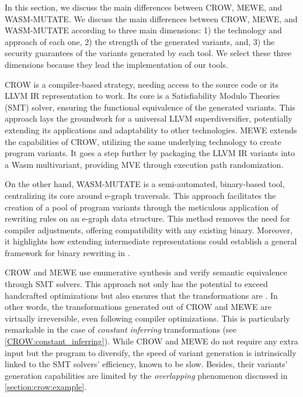 

In this section, we discuss the main differences between CROW, MEWE, and WASM-MUTATE.
We discuss the main differences between CROW, MEWE, and WASM-MUTATE according to three main dimensions: 1) the technology and approach of each one, 2) the strength of the generated variants, and, 3) the security guarantees of the variants generated by each tool.
We select these three dimensions because they lead the implementation of our tools.


CROW is a compiler-based strategy, needing access to the source code or its LLVM IR representation to work. 
Its core is a Satisfiability Modulo Theories (SMT) solver, ensuring the functional equivalence of the generated variants.
This approach lays the groundwork for a universal LLVM superdiversifier, potentially extending its applications and adaptability to other technologies.
MEWE extends the capabilities of CROW, utilizing the same underlying technology to create program variants. 
It goes a step further by packaging the LLVM IR variants into a Wasm multivariant, providing MVE through execution path randomization.

On the other hand, WASM-MUTATE is a semi-automated, binary-based tool, centralizing its core around e-graph traversals. 
This approach facilitates the creation of a pool of \Wasm program variants through the meticulous application of rewriting rules on an e-graph data structure. 
This method removes the need for compiler adjustments, offering compatibility with any existing \Wasm binary. 
Moreover, it highlights how extending intermediate representations could establish a general framework for binary rewriting in \Wasm.

CROW and MEWE use enumerative synthesis and verify semantic equivalence through SMT solvers. 
This approach not only has the potential to exceed handcrafted optimizations but also ensures that the transformations are . 
In other words, the transformations generated out of CROW and MEWE are virtually irreversible, even following compiler optimizations. 
This is particularly remarkable in the case of \emph{constant inferring} transformations (see \autoref{CROW:constant_inferring}).
While CROW and MEWE do not require any extra input but the program to diversify, the speed of variant generation is intrinsically linked to the SMT solvers' efficiency, known to be slow. 
Besides, their variants' generation capabilities are limited by the \emph{overlapping} phenomenon discussed in \autoref{section:crow:example}.


